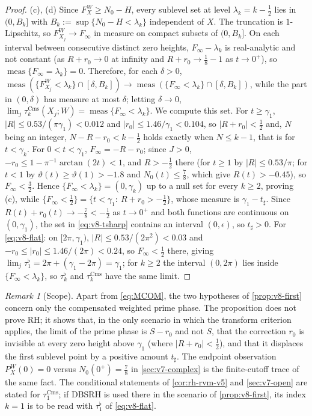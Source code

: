 \documentclass[11pt,a4paper]{article}
\numberwithin{equation}{section}
\theoremstyle{definition}
\theoremstyle{remark}
\newtheorem{remark}[theorem]{Remark}
\newcommand{\meas}{\operatorname{meas}}
\newcommand{\Cms}{\mathrm{Cms}}
\begin{document}
\begin{proof}
(c), (d) Since $F_X^W\ge N_0-H$, every sublevel set at level
$\lambda_k=k-\frac12$ lies in $(0,B_k]$ with
$B_k:=\sup\{N_0-H<\lambda_k\}$ independent of $X$. The truncation is
$1$-Lipschitz, so $F_{X_j}^W\to F_\infty$ in measure on compact subsets
of $(0,B_k]$. On each interval between consecutive distinct zero heights,
$F_\infty-\lambda_k$ is real-analytic and not constant (as
$R+r_0\to0$ at infinity and $R+r_0\to\frac18-1$ as $t\to0^+$), so
$\meas\{F_\infty=\lambda_k\}=0$. Therefore, for each $\delta>0$,
$\meas(\{F_{X_j}^W<\lambda_k\}\cap[\delta,B_k])\to\meas(\{F_\infty<\lambda_k\}\cap[\delta,B_k])$,
while the part in $(0,\delta)$ has measure at most $\delta$; letting
$\delta\to0$, $\lim_j\tau_k^{\Cms}(X_j;W)=\meas\{F_\infty<\lambda_k\}$.
We compute this set. For $t\ge\gamma_1$, $|R|\le0.53/(\pi\gamma_1)<0.012$
and $|r_0|\le1.46/\gamma_1<0.104$, so $|R+r_0|<\frac12$ and, $N$ being
an integer, $N-R-r_0<k-\frac12$ holds exactly when $N\le k-1$, that is
for $t<\gamma_k$. For $0<t<\gamma_1$, $F_\infty=-R-r_0$; since $J>0$,
$-r_0\le1-\pi^{-1}\arctan(2t)<1$, and $R>-\frac12$ there (for
$t\ge1$ by $|R|\le0.53/\pi$; for $t<1$ by $\vartheta(t)\ge\vartheta(1)>-1.8$
and $N_0(t)\le\frac78$, which give $R(t)>-0.45$), so $F_\infty<\frac32$.
Hence $\{F_\infty<\lambda_k\}=(0,\gamma_k)$ up to a null set for every
$k\ge2$, proving (c), while
$\{F_\infty<\frac12\}=\{t<\gamma_1:\ R+r_0>-\frac12\}$, whose measure is
$\gamma_1-t_\sharp$. Since $R(t)+r_0(t)\to-\frac78<-\frac12$ as
$t\to0^+$ and both functions are continuous on $(0,\gamma_1)$, the set in
\eqref{eq:v8-tsharp} contains an interval $(0,\epsilon)$, so $t_\sharp>0$.
For \eqref{eq:v8-flat}: on $[2\pi,\gamma_1)$, $|R|\le0.53/(2\pi^2)<0.03$
and $-r_0\le|r_0|\le1.46/(2\pi)<0.24$, so $F_\infty<\frac12$
there, giving $\lim_j\tau_1^\flat=2\pi+(\gamma_1-2\pi)=\gamma_1$; for
$k\ge2$ the interval $(0,2\pi)$ lies inside $\{F_\infty<\lambda_k\}$, so
$\tau_k^\flat$ and $\tau_k^{\Cms}$ have the same limit.
\end{proof}

\begin{remark}[Scope]
Apart from \eqref{eq:MCOM}, the two hypotheses of \cref{prop:v8-first} concern only the compensated
weighted prime phase. The proposition does not prove RH; it shows that,
in the only scenario in which the transform criterion applies, the
limit of the prime phase is $S-r_0$ and not $S$, that the correction
$r_0$ is invisible at every zero height above $\gamma_1$ (where
$|R+r_0|<\frac12$), and that it displaces the first sublevel point by a
positive amount $t_\sharp$. The endpoint observation $P_X^W(0)=0$ versus
$N_0(0^+)=\frac78$ in \cref{sec:v7-complex} is the finite-cutoff trace of
the same fact. The conditional statements of
\cref{cor:rh-rvm-v5} and \cref{sec:v7-open} are stated for $\tau_1^{\Cms}$; if DBSRH is used there in the scenario of \cref{prop:v8-first}, its index $k=1$ is to be read with $\tau_1^\flat$ of \eqref{eq:v8-flat}.
\end{remark}
\end{document}
